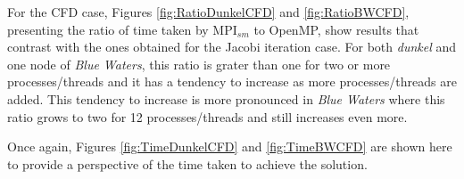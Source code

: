 For the CFD case, Figures \ref{fig:RatioDunkelCFD} and \ref{fig:RatioBWCFD}, presenting the ratio of time taken by MPI$_{sm}$ to OpenMP, show results that contrast with the ones obtained for the Jacobi iteration case. For both \emph{dunkel} and one node of \emph{Blue Waters}, this ratio is grater than one for two or more processes/threads and it has a tendency to increase as more processes/threads are added. This tendency to increase is more pronounced in \emph{Blue Waters} where this ratio grows to two for 12 processes/threads and still increases even more.

Once again, Figures \ref{fig:TimeDunkelCFD} and \ref{fig:TimeBWCFD} are shown here to provide a perspective of the time taken to achieve the solution. 

\medskip

\begin{comment}
\subsubsection*{Partial improvement using node topology}

Information about hardware threads, core, cache, socket topology can help to implement binding between cores and processes/threads. It is known that applications with frequent synchronization between "neighboring" processes/threads could profit from placing them close together. To test this idea, a simple tool called \emph{\textbf{taskset}} was used in \emph{dunkel} in a setting similar to the one used to produce Figure \ref{fig:Figure3}. This particular computer (\emph{dunkel}) has two sockets, each having 12 cores, for a total of 24 cores, each corresponding to the 24 processes/threads shown in Figures \ref{fig:Figure1} and \ref{fig:Figure3}. The 12 cores in one socket of \emph{dunkel} shared 30 Mbi of L3 cache. A new experiment was set to run within a single socket using the '-c 0-11' parameter of taskset. 

The results of this new experiment are shown in Figure \ref{fig:taskset}. Notice that only 12 processes/threads are uses. 

\medskip


\begin{figure} [h!]
    \centering
    \captionsetup{justification=raggedright, singlelinecheck=false}
    \begin{subfigure}{.6\textwidth}
      \hspace*{-1.5cm} 
      \texttt{[image: Plots/section3.2/dunkel-DP-1SoketRatio.pdf]}
      \caption{Computational Fluid Dynamic - Ratio MPI$_{sm}$ to OpenMP.}
      \label{fig:RatioDunkelCFD_Pin}
    \end{subfigure}%
    \begin{subfigure}{.6\textwidth}
      \hspace*{-1.5cm} 
      \texttt{[image: Plots/section3.2/dunkel-DP-1Soket.pdf]}
      \caption{Computational Fluid Dynamic - Execution time}
      \label{fig:TimeDunkelCFD_Pin}
    \end{subfigure}
\caption{Comparing shared memory programing models - CFD in \emph{dunkel}}
\label{fig:taskset}
\end{figure}


\end{comment}
